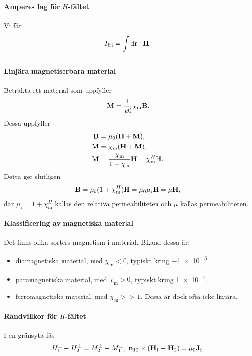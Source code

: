 \paragraph{Amperes lag för $H$-fältet}
Vi får
\begin{align*}
	I_{\text{fri}} = \int\limits_{}^{}\dd{\vb{r}}\cdot \vb{H}.
\end{align*}

\paragraph{Linjära magnetiserbara material}
Betrakta ett material som uppfyller
\begin{align*}
	\vb{M} = \frac{1}{\mu{0}}\chi_{\text{m}}\vb{B}.
\end{align*}
Dessa uppfyller
\begin{align*}
	\vb{B} &= \mu_{0}(\vb{H} + \vb{M}), \\
	\vb{M} &= \chi_{\text{m}}(\vb{H} + \vb{M}), \\
	\vb{M} &= \frac{\chi_{\text{m}}}{1 - \chi_{\text{m}}}\vb{H} = \chi_{\text{m}}^{H}\vb{H}.
\end{align*}
Detta ger slutligen
\begin{align*}
	\vb{B} = \mu_{0}(1 + \chi_{\text{m}}^{H})\vb{H} = \mu_{0}\mu_{\text{r}}\vb{H} = \mu\vb{H},
\end{align*}
där $\mu_{\text{r}} = 1 + \chi_{\text{m}}^{H}$ kallas den relativa permeabiliteten och $\mu$ kallas permeabiliteten.

\paragraph{Klassificering av magnetiska material}
Det finns olika sorters magnetism i material. BLand dessa är:
\begin{itemize}
	\item diamagnetiska material, med $\chi_{\text{m}} < 0$, typiskt kring \num{-1e-5}.
	\item paramagnetiska material, med $\chi_{\text{m}} > 0$, typiskt kring \num{1e-4}.
	\item ferromagnetiska material, med $\chi_{\text{m}} >> 1$. Dessa är dock ofta icke-linjära.
\end{itemize}

\paragraph{Randvillkor för $H$-fältet}
I en gränsyta fås
\begin{align*}
	H_{1}^{\perp} - H_{2}^{\perp} = M_{2}^{\perp} - M_{1}^{\perp},\ \vb{n}_{12}\times(\vb{H}_{1} - \vb{H}_{2}) = \mu_{0}\vb{J}_{\text{f}}.
\end{align*}
